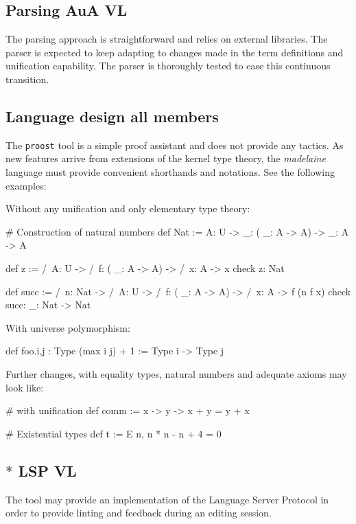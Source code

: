 \documentclass[twocolumn]{article}
\newcommand{\members}[1]{\texorpdfstring{\hfill\scriptsize #1}{}}
\begin{document}
\subsection{Parsing \members{AuA VL}}
The parsing approach is straightforward and relies on external libraries. The
parser is expected to keep adapting to changes made in the term definitions and
unification capability. The parser is thoroughly tested to ease this continuous transition.


\subsection{Language design \members{all members}}
The \texttt{proost} tool is a simple proof assistant and does not provide any
tactics. As new features arrive from extensions of the kernel type theory, the
\emph{madelaine} language must provide convenient shorthands and notations. See
the following examples:

Without any unification and only elementary type theory:
\begin{proost}
# Construction of natural numbers
def Nat := \/ A: U ->
  \/ _: (\/ _: A -> A) -> \/ _: A -> A

def z := /\ A: U ->
  /\ f: (\/ _: A -> A) -> /\ x: A -> x
check z: Nat

def succ := /\ n: Nat -> /\ A: U ->
  /\ f: (\/ _: A -> A) -> /\ x: A ->
  f (n f x)
check succ: \/ _: Nat -> Nat
\end{proost}

With universe polymorphism:
\begin{proost}
def foo.{i,j} : Type (max i j) + 1 := Type i -> Type j
\end{proost}

Further changes, with equality types, natural numbers and adequate axioms may
look like:
\begin{proost}
# with unification
def comm := \/ x -> \/ y -> x + y = y + x

# Existential types
def t := E n, n * n - n + 4 = 0
\end{proost}


\subsection{\texorpdfstring{\(*\)}{*} LSP \members{VL}}
The tool may provide an implementation of the Language Server Protocol in
order to provide linting and feedback during an editing session.

\end{document}
